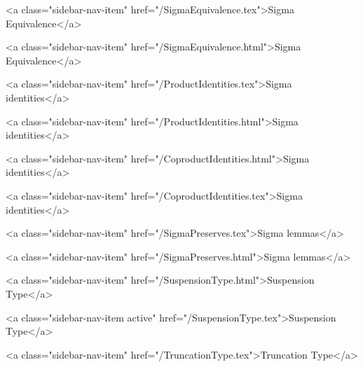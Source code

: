      
    
      
        
          <a class="sidebar-nav-item" href="/SigmaEquivalence.tex">Sigma Equivalence</a>
        
      
    
      
        
          <a class="sidebar-nav-item" href="/SigmaEquivalence.html">Sigma Equivalence</a>
        
      
    
      
        
          <a class="sidebar-nav-item" href="/ProductIdentities.tex">Sigma identities</a>
        
      
    
      
        
          <a class="sidebar-nav-item" href="/ProductIdentities.html">Sigma identities</a>
        
      
    
      
        
          <a class="sidebar-nav-item" href="/CoproductIdentities.html">Sigma identities</a>
        
      
    
      
        
          <a class="sidebar-nav-item" href="/CoproductIdentities.tex">Sigma identities</a>
        
      
    
      
        
          <a class="sidebar-nav-item" href="/SigmaPreserves.tex">Sigma lemmas</a>
        
      
    
      
        
          <a class="sidebar-nav-item" href="/SigmaPreserves.html">Sigma lemmas</a>
        
      
    
      
        
          <a class="sidebar-nav-item" href="/SuspensionType.html">Suspension Type</a>
        
      
    
      
        
          <a class="sidebar-nav-item active" href="/SuspensionType.tex">Suspension Type</a>
        
      
    
      
        
          <a class="sidebar-nav-item" href="/TruncationType.tex">Truncation Type</a>
        
